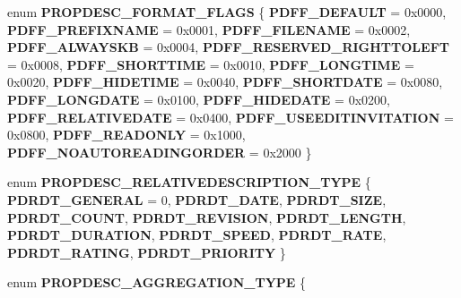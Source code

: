 \begin{DoxyCompactItemize}
enum {\bfseries P\+R\+O\+P\+D\+E\+S\+C\+\_\+\+F\+O\+R\+M\+A\+T\+\_\+\+F\+L\+A\+GS} \{ \newline
{\bfseries P\+D\+F\+F\+\_\+\+D\+E\+F\+A\+U\+LT} = 0x0000, 
{\bfseries P\+D\+F\+F\+\_\+\+P\+R\+E\+F\+I\+X\+N\+A\+ME} = 0x0001, 
{\bfseries P\+D\+F\+F\+\_\+\+F\+I\+L\+E\+N\+A\+ME} = 0x0002, 
{\bfseries P\+D\+F\+F\+\_\+\+A\+L\+W\+A\+Y\+S\+KB} = 0x0004, 
\newline
{\bfseries P\+D\+F\+F\+\_\+\+R\+E\+S\+E\+R\+V\+E\+D\+\_\+\+R\+I\+G\+H\+T\+T\+O\+L\+E\+FT} = 0x0008, 
{\bfseries P\+D\+F\+F\+\_\+\+S\+H\+O\+R\+T\+T\+I\+ME} = 0x0010, 
{\bfseries P\+D\+F\+F\+\_\+\+L\+O\+N\+G\+T\+I\+ME} = 0x0020, 
{\bfseries P\+D\+F\+F\+\_\+\+H\+I\+D\+E\+T\+I\+ME} = 0x0040, 
\newline
{\bfseries P\+D\+F\+F\+\_\+\+S\+H\+O\+R\+T\+D\+A\+TE} = 0x0080, 
{\bfseries P\+D\+F\+F\+\_\+\+L\+O\+N\+G\+D\+A\+TE} = 0x0100, 
{\bfseries P\+D\+F\+F\+\_\+\+H\+I\+D\+E\+D\+A\+TE} = 0x0200, 
{\bfseries P\+D\+F\+F\+\_\+\+R\+E\+L\+A\+T\+I\+V\+E\+D\+A\+TE} = 0x0400, 
\newline
{\bfseries P\+D\+F\+F\+\_\+\+U\+S\+E\+E\+D\+I\+T\+I\+N\+V\+I\+T\+A\+T\+I\+ON} = 0x0800, 
{\bfseries P\+D\+F\+F\+\_\+\+R\+E\+A\+D\+O\+N\+LY} = 0x1000, 
{\bfseries P\+D\+F\+F\+\_\+\+N\+O\+A\+U\+T\+O\+R\+E\+A\+D\+I\+N\+G\+O\+R\+D\+ER} = 0x2000
 \}
\item 
\mbox{\label{interface_i_property_description_a771d306d05ea48ed541f9543ef3d7648}} 
enum {\bfseries P\+R\+O\+P\+D\+E\+S\+C\+\_\+\+R\+E\+L\+A\+T\+I\+V\+E\+D\+E\+S\+C\+R\+I\+P\+T\+I\+O\+N\+\_\+\+T\+Y\+PE} \{ \newline
{\bfseries P\+D\+R\+D\+T\+\_\+\+G\+E\+N\+E\+R\+AL} = 0, 
{\bfseries P\+D\+R\+D\+T\+\_\+\+D\+A\+TE}, 
{\bfseries P\+D\+R\+D\+T\+\_\+\+S\+I\+ZE}, 
{\bfseries P\+D\+R\+D\+T\+\_\+\+C\+O\+U\+NT}, 
\newline
{\bfseries P\+D\+R\+D\+T\+\_\+\+R\+E\+V\+I\+S\+I\+ON}, 
{\bfseries P\+D\+R\+D\+T\+\_\+\+L\+E\+N\+G\+TH}, 
{\bfseries P\+D\+R\+D\+T\+\_\+\+D\+U\+R\+A\+T\+I\+ON}, 
{\bfseries P\+D\+R\+D\+T\+\_\+\+S\+P\+E\+ED}, 
\newline
{\bfseries P\+D\+R\+D\+T\+\_\+\+R\+A\+TE}, 
{\bfseries P\+D\+R\+D\+T\+\_\+\+R\+A\+T\+I\+NG}, 
{\bfseries P\+D\+R\+D\+T\+\_\+\+P\+R\+I\+O\+R\+I\+TY}
 \}
\item 
\mbox{\label{interface_i_property_description_ac1ffc0245e97dd5562f07cb1d976397f}} 
enum {\bfseries P\+R\+O\+P\+D\+E\+S\+C\+\_\+\+A\+G\+G\+R\+E\+G\+A\+T\+I\+O\+N\+\_\+\+T\+Y\+PE} \{ \newline

\end{DoxyCompactItemize}
